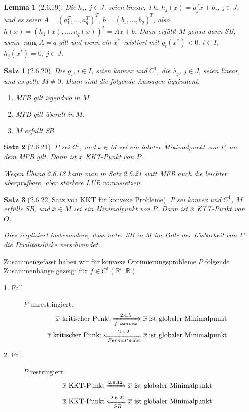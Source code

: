 \documentclass[12pt]{extreport} %
\newcommand{\R}{\mathbb{R}}
\theoremstyle{named}
\theoremstyle{nnamed}
\theoremstyle{itshape}
\newtheorem*{satz}{Satz}
\theoremstyle{normal}
\newtheorem*{lemma}{Lemma}
\begin{document}
\begin{lemma}[2.6.19]
	Die $h_j$, $j \in J$, seien linear, d.h. $h_j(x) = a^T_j x + b_j$, $j \in J$, und es seien $A = (a_1^T, \dotsc, a_q^T)^T$, $b = (b_1, \dotsc, b_q)^T$, also $h(x) = (h_1(x), \dotsc, h_q(x))^T = Ax + b$. Dann erfüllt $M$ genau dann SB, wenn $\operatorname{rang}A = q$ gilt und wenn ein $x^*$ existiert mit $g_i(x^*) < 0$, $i \in I$, $h_j(x^*) = 0$, $j \in J$.
\end{lemma}

\begin{satz}[2.6.20]
	Die $g_i$, $i \in I$, seien konvex und $C^1$, die $h_j$, $j \in J$, seien linear, und es gelte $M \neq 0$. Dann sind die folgende Aussagen äquivalent:
	\begin{enumerate}
		\item MFB gilt irgendwo in $M$
		\item MFB gilt überall in $M$.
		\item $M$ erfüllt SB
	\end{enumerate}
\end{satz}

\begin{satz}[2.6.21]
	$P$ sei $C^1$, und $\overline{x} \in M$ sei ein lokaler Minimalpunkt von $P$, an dem MFB gilt. Dann ist $\overline{x}$ KKT-Punkt von $P$.	 ~\bigskip
	
	Wegen Übung 2.6.18 kann man in Satz 2.6.21 statt MFB auch die leichter überprüfbare, aber stärkere LUB voraussetzen.
\end{satz}
		
\begin{satz}[2.6.22, Satz von KKT für konvexe Probleme]		
	$P$ sei konvex und $C^1$, $M$ erfülle SB, und $\overline{x} \in M$ sei ein Minimalpunkt von $P$. Dann ist $\overline{x}$ KTT-Punkt von $O$.	 ~\bigskip
	
	Dies impliziert insbesondere, dass unter SB in $M$ im Falle der Lösbarkeit von $P$ die Dualitätslücke verschwindet.
\end{satz}

\newpage

Zusammengefasst haben wir für konvexe Optimierungsprobleme $P$ folgende Zusammenhänge gezeigt für $f \in C^1(\R^n, \R)$
\begin{description}
	\item[1. Fall] $P$ unrestringiert.
		\begin{align*}
			\overline{x} \text{ kritischer Punkt}  \xRightarrow[f~konvex]{2.4.5} \overline{x} \text{ ist globaler Minimalpunkt} \\
			\overline{x} \text{ kritischer Punkt}  \xLeftarrow[Fermat'sche]{2.4.2} \overline{x} \text{ ist globaler Minimalpunkt}
		\end{align*}
	\item[2. Fall] $P$ restringiert
		\begin{align*}
			\overline{x} \text{ KKT-Punkt}  \xRightarrow[]{2.6.12} \overline{x} \text{ ist globaler Minimalpunkt} \\
			\overline{x} \text{ KKT-Punkt}  \xLeftarrow[SB]{2.6.22} \overline{x} \text{ ist globaler Minimalpunkt}
		\end{align*}
\end{description}
\end{document}
